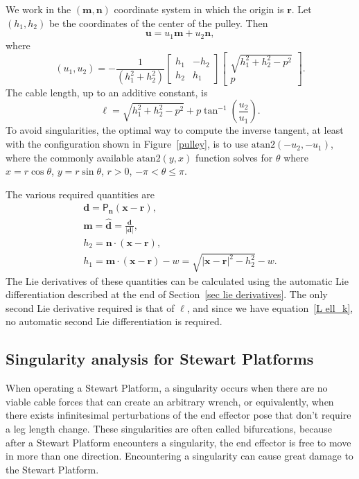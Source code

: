\documentclass[reqno,12pt]{amsart}
\begin{document}
We work in the $(\bm m, \bm n)$ coordinate system in which the origin is $\bm r$.  Let $(h_1,h_2)$ be the coordinates of the center of the pulley.  Then
\begin{equation}
\bm u = u_1 \bm m + u_2 \bm n,
\end{equation}
where
\begin{equation}
(u_1, u_2) = - \frac1{(h_1^2+h_2^2)}
\begin{bmatrix}
h_1 & -h_2 \\
h_2 & h_1
\end{bmatrix}
\begin{bmatrix}
\sqrt{h_1^2+h_2^2 - p^2} \\ p
\end{bmatrix}.
\end{equation}
The cable length, up to an additive constant, is
\begin{equation}
\ell = \sqrt{h_1^2 + h_2^2 - p ^2} + p \tan^{-1}\left(\frac{u_2}{u_1}\right).
\end{equation}
To avoid singularities, the optimal way to compute the inverse tangent, at least with the configuration shown in Figure~\ref{pulley}, is to use $\text{atan2}(-u_2, -u_1)$, where the commonly available $\text{atan2}(y,x)$ function solves for $\theta$ where $x = r \cos\theta$, $y = r \sin\theta$, $ r > 0$, $-\pi < \theta \le \pi$.

The various required quantities are
\begin{gather}
\bm d = \mathsf P_{\bm n} (\bm x - \bm r) , \\ 
\bm m = \widehat{\bm d} = \frac{\bm d}{|\bm d|}, \\
h_2 = \bm n \cdot (\bm x - \bm r) , \\
h_1 = \bm m \cdot (\bm x - \bm r) - w = \sqrt{|\bm x - \bm r|^2 - h_2^2} - w .
\end{gather}
The Lie derivatives of these quantities can be calculated using the automatic Lie differentiation described at the end of Section~\ref{sec lie derivatives}.  The only second Lie derivative required is that of $\ell$, and since we have equation~\eqref{L ell_k}, no automatic second Lie differentiation is required.

\subsection{Singularity analysis for Stewart Platforms}

When operating a Stewart Platform, a singularity occurs when there are no viable cable forces that can create an arbitrary wrench, or equivalently, when there exists infinitesimal perturbations of the end effector pose that don't require a leg length change.  These singularities are often called bifurcations, because after a Stewart Platform encounters a singularity, the end effector is free to move in more than one direction.  Encountering a singularity can cause great damage to the Stewart Platform.
\end{document}
